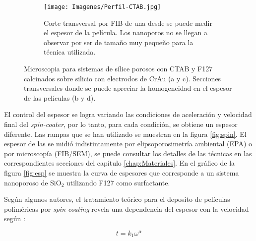 \begin{figure}[th]
\begin{subfigure}[t]{0.49\textwidth}
			       		\label{fig:sem_homogeneidad3}
			       		\end{subfigure}
					\begin{subfigure}[t]{0.49\textwidth}
			 	   	    \texttt{[image: Imagenes/Perfil-CTAB.jpg]}
			       		\caption{Corte transversal por FIB de una \pdmC\space desde se puede medir el espesor de la película. Los nanoporos no se llegan a observar por ser de tamaño muy pequeño para la técnica utilizada.}
			       		\label{fig:sem_homogeneidad4}
			       		\end{subfigure}	
					 \caption[MEB \pdmC\space y \pdmF.]{Microscopia para sistemas de sílice porosos con CTAB y F127 calcinados sobre silicio con electrodos de Cr\textbar Au (a y c). Secciones transversales donde se puede apreciar la homogeneidad en el espesor de las películas (b y d).}
					 \label{fig:sem_homogeneidad}	
				     \end{figure}

		El control del espesor se logra variando las condiciones de aceleración y velocidad final del \textit{spin-coater}, por lo tanto, para cada condición, se obtiene un espesor diferente. Las rampas que se han utilizado se muestran en la figura \ref{fig:spin}. El espesor de las \pdm\space se midió indistintamente por elipsoporosimetría ambiental (EPA) o por microscopía (FIB/SEM), se puede consultar los detalles de las técnicas en las correspondientes secciones del capítulo \ref{chap:Materiales}. En el gráfico de la figura \ref{fig:esp} se muestra la curva de espesores que corresponde a un sistema nanoporoso de SiO$_2$ utilizando F127 como surfactante. 

		\pagebreak

		Según algunos autores, el tratamiento teórico para el deposito de películas poliméricas por \textit{spin-coating} revela una dependencia del espesor con la velocidad según \cite{Norrman2005,Meyerhofer1978,Bornside1989,Lora1990}:
					
						\begin{equation}
			 			    t = k_1 \omega^{\alpha}
			 		    	 \label{eq:spin_meso}
							\end{equation}
		
